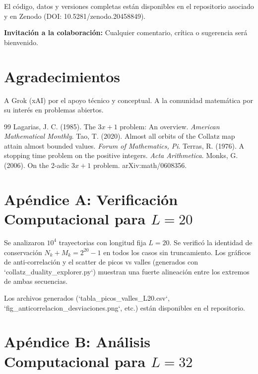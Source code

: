 \documentclass[11pt,a4paper]{article}
\begin{document}
El código, datos y versiones completas están disponibles en el repositorio asociado y en Zenodo (DOI: 10.5281/zenodo.20458849).

\vspace{1em}
\noindent\textbf{Invitación a la colaboración:} Cualquier comentario, crítica o sugerencia será bienvenido.

\section*{Agradecimientos}
A Grok (xAI) por el apoyo técnico y conceptual. A la comunidad matemática por su interés en problemas abiertos.

\begin{thebibliography}{99}
 Lagarias, J. C. (1985). The $3x+1$ problem: An overview. \textit{American Mathematical Monthly}.
 Tao, T. (2020). Almost all orbits of the Collatz map attain almost bounded values. \textit{Forum of Mathematics, Pi}.
 Terras, R. (1976). A stopping time problem on the positive integers. \textit{Acta Arithmetica}.
 Monks, G. (2006). On the 2-adic $3x+1$ problem. arXiv:math/0608356.
\end{thebibliography}


\appendix

\section{Apéndice A: Verificación Computacional para $L=20$}
\label{app:A}

Se analizaron $10^4$ trayectorias con longitud fija $L=20$. Se verificó la identidad de conservación $N_k + M_k = 2^{20}-1$ en todos los casos sin truncamiento. Los gráficos de anti-correlación y el scatter de picos vs valles (generados con `collatz_duality_explorer.py`) muestran una fuerte alineación entre los extremos de ambas secuencias.

Los archivos generados (`tabla_picos_valles_L20.csv`, `fig_anticorrelacion_desviaciones.png`, etc.) están disponibles en el repositorio.

\section{Apéndice B: Análisis Computacional para $L=32$}
\label{app:B}
\end{document}
